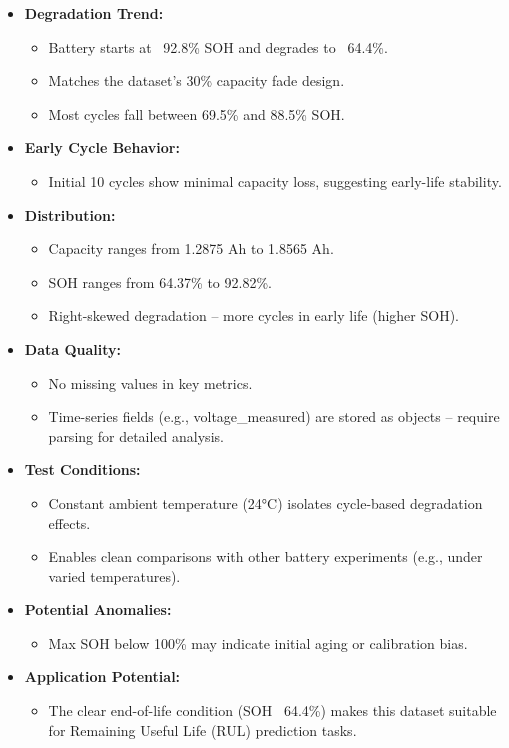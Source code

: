 \begin{itemize}
    \item \textbf{Degradation Trend:}
    \begin{itemize}
        \item Battery starts at ~92.8\% SOH and degrades to ~64.4\%.
        \item Matches the dataset's 30\% capacity fade design.
        \item Most cycles fall between 69.5\% and 88.5\% SOH.
    \end{itemize}

    \item \textbf{Early Cycle Behavior:}
    \begin{itemize}
        \item Initial 10 cycles show minimal capacity loss, suggesting early-life stability.
    \end{itemize}

    \item \textbf{Distribution:}
    \begin{itemize}
        \item Capacity ranges from 1.2875 Ah to 1.8565 Ah.
        \item SOH ranges from 64.37\% to 92.82\%.
        \item Right-skewed degradation – more cycles in early life (higher SOH).
    \end{itemize}

    \item \textbf{Data Quality:}
    \begin{itemize}
        \item No missing values in key metrics.
        \item Time-series fields (e.g., voltage\_measured) are stored as objects – require parsing for detailed analysis.
    \end{itemize}

    \item \textbf{Test Conditions:}
    \begin{itemize}
        \item Constant ambient temperature (24°C) isolates cycle-based degradation effects.
        \item Enables clean comparisons with other battery experiments (e.g., under varied temperatures).
    \end{itemize}

    \item \textbf{Potential Anomalies:}
    \begin{itemize}
        \item Max SOH below 100\% may indicate initial aging or calibration bias.
    \end{itemize}

    \item \textbf{Application Potential:}
    \begin{itemize}
        \item The clear end-of-life condition (SOH ~64.4\%) makes this dataset suitable for Remaining Useful Life (RUL) prediction tasks.
    \end{itemize}
\end{itemize}


